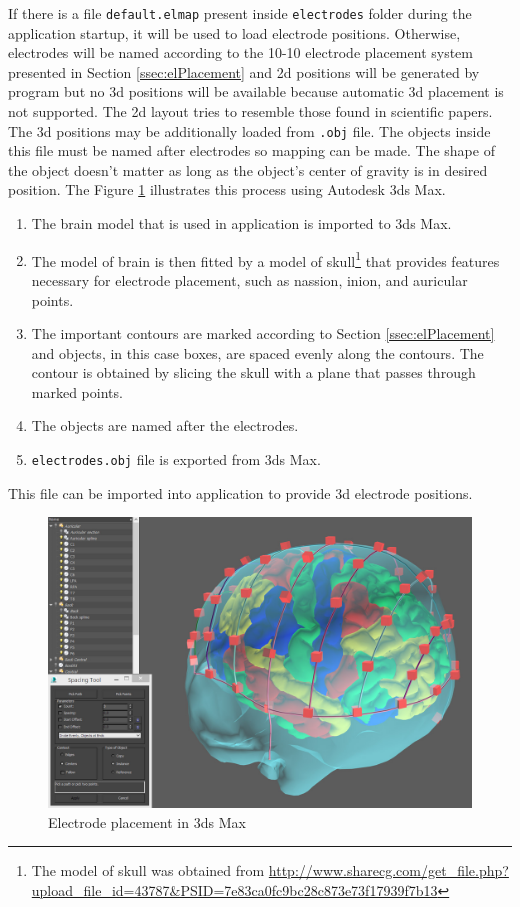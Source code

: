 If there is a file \texttt{default.elmap} present inside \texttt{electrodes} folder during the application startup, it will be used to load electrode positions. Otherwise, electrodes will be named according to the 10-10 electrode placement system presented in Section \ref{ssec:elPlacement} and \gls{2d} positions will be generated by program but no \gls{3d} positions will be available because automatic \gls{3d} placement is not supported. The \gls{2d} layout tries to resemble those found in scientific papers. The \gls{3d} positions may be additionally loaded from \texttt{.obj} file. The objects inside this file must be named after electrodes so mapping can be made. The shape of the object doesn't matter as long as the object's center of gravity is in desired position. The Figure \ref{fig:3DSMaxPlacement} illustrates this process using Autodesk 3ds Max. 
\begin{enumerate}
	\item The brain model that is used in application is imported to 3ds Max.
	\item The model of brain is then fitted by a model of skull\footnote{The model of skull was obtained from \url{http://www.sharecg.com/get_file.php?upload_file_id=43787&PSID=7e83ca0fc9bc28c873e73f17939f7b13}} that provides features necessary for electrode placement, such as nassion, inion, and auricular points.
	\item The important contours are marked according to Section \ref{ssec:elPlacement} and objects, in this case boxes, are spaced evenly along the contours. The contour is obtained by slicing the skull with a plane that passes through marked points. 
	\item The objects are named after the electrodes.
	\item \texttt{electrodes.obj} file is exported from 3ds Max.
\end{enumerate}
This file can be imported into application to provide \gls{3d} electrode positions.

\begin{figure}[htb]
	\centering
	\includegraphics[width=1\linewidth]{fig/3DSMaxPlacement.jpg}
	\caption{Electrode placement in 3ds Max}
	\label{fig:3DSMaxPlacement}
\end{figure}

